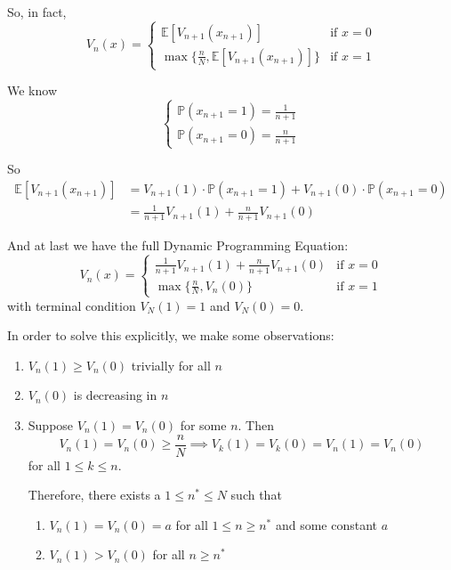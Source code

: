 \documentclass[12pt]{report}
\renewcommand{\P}{\mathbb{P}}
\newcommand{\E}{\mathbb{E}}
\begin{document}
        So, in fact, 
        \[V_n(x) = \begin{cases}
            \E[V_{n+1}(x_{n+1})] & \text{if } x = 0\\
            \max\{\frac{n}{N}, \E[V_{n+1}(x_{n+1})]\} & \text{if } x = 1
        \end{cases}\]
        
        We know 
        \[\begin{cases}
            \P(x_{n+1} = 1) = \frac{1}{n+1}\\
            \P(x_{n+1} = 0) = \frac{n}{n+1}
        \end{cases}\] 

        So 
        \begin{align*}
            \E[V_{n+1}(x_{n+1})] &= V_{n+1}(1) \cdot \P(x_{n+1} = 1) + V_{n+1}(0) \cdot \P(x_{n+1} = 0)\\ 
                &= \frac{1}{n+1} V_{n+1}(1) + \frac{n}{n+1} V_{n+1}(0)
        \end{align*}

        And at last we have the full Dynamic Programming Equation:
        \[V_n(x) = \begin{cases}
            \frac{1}{n+1} V_{n+1}(1) + \frac{n}{n+1} V_{n+1}(0) & \text{if } x = 0\\
            \max\{\frac{n}{N}, V_n(0)\} & \text{if } x = 1
        \end{cases}\]
        with terminal condition $V_N(1) = 1$ and $V_N(0) = 0$.

        In order to solve this explicitly, we make some observations:
        \begin{enumerate}
            \item $V_n(1) \geq V_n(0)$ trivially for all $n$ 
            \item $V_n(0)$ is decreasing in $n$ 
            \item Suppose $V_n(1) = V_n(0)$ for some $n$. Then 
            \[V_n(1) = V_n(0) \geq \frac{n}{N} \implies V_k(1) = V_k(0) = V_n(1) = V_n(0)\]
            for all $1 \leq k \leq n$. 

            Therefore, there exists a $1 \leq n^* \leq N$ such that 
            \begin{enumerate}[label=(\alph*)]
                \item $V_n(1) = V_n(0) = a$ for all $1 \leq n \geq n^*$ and some constant $a$
                \item $V_n(1) > V_n(0)$ for all $n \geq n^*$ 
            \end{enumerate}
        \end{enumerate}
\end{document}
